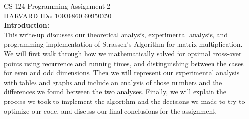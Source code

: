 \documentclass[11pt]{article}
\begin{document}
CS 124 Programming Assignment 2 \\
\indent HARVARD IDs: 10939860 60950350
\\

\textbf{Introduction:}\\
This write-up discusses our theoretical analysis, experimental analysis, and programming implementation of Strassen's Algorithm for matrix multiplication. We will first walk through how we mathematically solved for optimal cross-over points using recurrence and running times, and distinguishing between the cases for even and odd dimensions. Then we will represent our experimental analysis with tables and graphs and include an analysis of those numbers and the differences we found between the two analyses. Finally, we will explain the process we took to implement the algorithm and the decisions we made to try to optimize our code, and discuss our final conclusions for the assignment. \\\\
\end{document}

